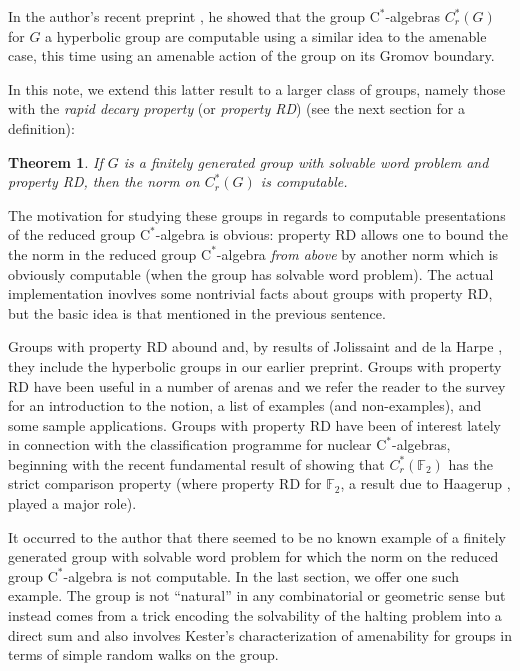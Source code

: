 \documentclass[10pt,a4paper]{amsart}
\newcommand{\cstar}{$\mathrm{C}^*$}
\theoremstyle{plain}
\newtheorem{theorem}{Theorem}[section]
\theoremstyle{definition}
\numberwithin{equation}{section}
\begin{document}
In the author's recent preprint \cite{goldbring}, he showed that the group \cstar-algebras $C^*_r(G)$ for $G$ a hyperbolic group are computable using a similar idea to the amenable case, this time using an amenable action of the group on its Gromov boundary.

In this note, we extend this latter result to a larger class of groups, namely those with the \emph{rapid decary property} (or \emph{property RD}) (see the next section for a definition):

\begin{theorem}
If $G$ is a finitely generated group with solvable word problem and property RD, then the norm on $C^*_r(G)$ is computable.
\end{theorem}

The motivation for studying these groups in regards to computable presentations of the reduced group \cstar-algebra is obvious:  property RD allows one to bound the the norm in the reduced group \cstar-algebra \emph{from above} by another norm which is obviously computable (when the group has solvable word problem).  The actual implementation inovlves some nontrivial facts about groups with property RD, but the basic idea is that mentioned in the previous sentence.  

Groups with property RD abound and, by results of Jolissaint \cite{jolissaint} and de la Harpe \cite{DLH}, they include the hyperbolic groups in our earlier preprint.  Groups with property RD have been useful in a number of arenas and we refer the reader to the survey \cite{chatterji} for an introduction to the notion, a list of examples (and non-examples), and some sample applications.  Groups with property RD have been of interest lately in connection with the classification programme for nuclear \cstar-algebras, beginning with the recent fundamental result of \cite{strict} showing that $C^*_r(\mathbb{F}_2)$ has the strict comparison property (where property RD for $\mathbb{F}_2$, a result due to Haagerup \cite{haagerup}, played a major role).

It occurred to the author that there seemed to be no known example of a finitely generated group with solvable word problem for which the norm on the reduced group \cstar-algebra is not computable.  In the last section, we offer one such example.  The group is not ``natural'' in any combinatorial or geometric sense but instead comes from a trick encoding the solvability of the halting problem into a direct sum and also involves Kester's characterization of amenability for groups in terms of simple random walks on the group.
\end{document}

